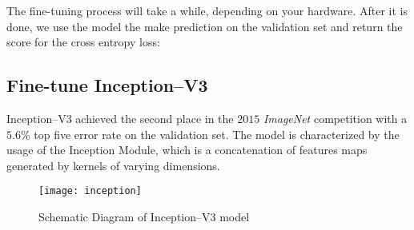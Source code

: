 
The fine-tuning process will take a while, depending on your hardware. 
After it is done, we use the model the make prediction on the validation set 
and return the score for the cross entropy loss:



\subsection{Fine-tune Inception--V3}
\label{ssec:inception}
Inception--V3 achieved the second place in the $2015$ \emph{ImageNet} 
competition with a $5.6 \%$ top five error rate on the validation set. 
The model is characterized by the usage of the Inception Module, which is a 
concatenation of features maps generated by kernels of varying dimensions.
%
\begin{figure}[htb]
\centering
\texttt{[image: inception]}
\caption{Schematic Diagram of Inception--V3 model}
\label{fig:inceptionV3schema}
\end{figure}
%
